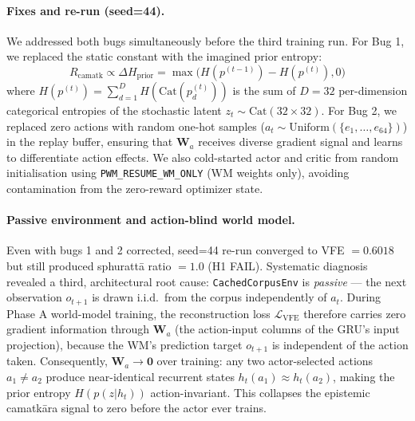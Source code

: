 \documentclass[journal,onecolumn,11pt]{IEEEtran}
\begin{document}
\paragraph{Fixes and re-run (seed=44).}
We addressed both bugs simultaneously before the third training run.
For Bug 1, we replaced the static constant with the imagined prior entropy:
%
\begin{equation}
R_{\text{camatk}} \propto \Delta H_{\text{prior}} = \max\bigl(H(p^{(t-1)}) - H(p^{(t)}), 0\bigr)
\end{equation}
%
where $H(p^{(t)}) = \sum_{d=1}^{D} H(\text{Cat}(p_d^{(t)}))$ is the sum of
$D{=}32$ per-dimension categorical entropies of the stochastic latent
$z_t \sim \text{Cat}(32{\times}32)$.
For Bug 2, we replaced zero actions with random one-hot samples
($a_t \sim \text{Uniform}(\{e_1,\ldots,e_{64}\})$) in the replay buffer, ensuring
that $\mathbf{W}_a$ receives diverse gradient signal and learns to
differentiate action effects.
We also cold-started actor and critic from random initialisation using
\texttt{PWM\_RESUME\_WM\_ONLY} (WM weights only), avoiding contamination from
the zero-reward optimizer state.

\paragraph{Passive environment and action-blind world model.}
Even with bugs 1 and 2 corrected, seed=44 re-run converged to VFE $= 0.6018$
but still produced sphurattā ratio $= 1.0$ (H1 FAIL).
Systematic diagnosis revealed a third, architectural root cause:
\texttt{CachedCorpusEnv} is \emph{passive} — the next observation $o_{t+1}$
is drawn i.i.d.\ from the corpus independently of $a_t$.
During Phase A world-model training, the reconstruction loss $\mathcal{L}_{\text{VFE}}$
therefore carries zero gradient information through $\mathbf{W}_a$
(the action-input columns of the GRU's input projection), because the WM's
prediction target $o_{t+1}$ is independent of the action taken.
Consequently, $\mathbf{W}_a \to \mathbf{0}$ over training:
any two actor-selected actions $a_1 \neq a_2$ produce near-identical
recurrent states $h_t(a_1) \approx h_t(a_2)$, making the prior
entropy $H(p(z|h_t))$ action-invariant.
This collapses the epistemic camatkāra signal to zero before the actor
ever trains.
\end{document}

